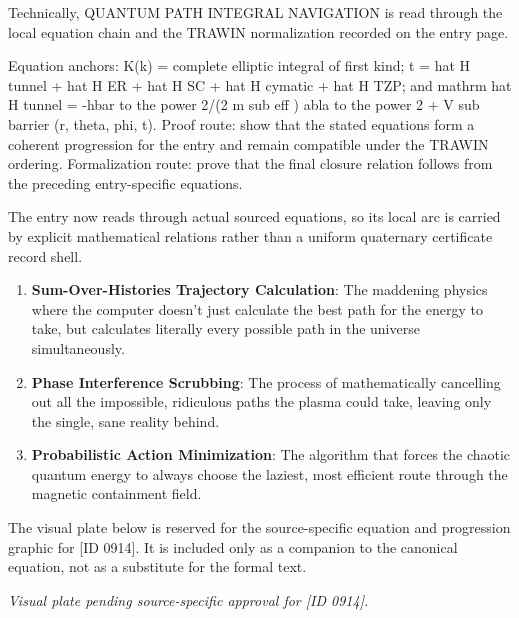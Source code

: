 Technically, QUANTUM PATH INTEGRAL NAVIGATION is read through the local equation chain and the TRAWIN normalization recorded on the entry page.

Equation anchors: K(k) = complete elliptic integral of first kind; t = hat H tunnel + hat H ER + hat H SC + hat H cymatic + hat H TZP; and mathrm hat H tunnel = -hbar to the power 2/(2 m sub eff ) abla to the power 2 + V sub barrier (r, theta, phi, t). Proof route: show that the stated equations form a coherent progression for the entry and remain compatible under the TRAWIN ordering. Formalization route: prove that the final closure relation follows from the preceding entry-specific equations.

The entry now reads through actual sourced equations, so its local arc is carried by explicit mathematical relations rather than a uniform quaternary certificate record shell.
\endgroup

\begin{enumerate}[leftmargin=1.6em,itemsep=6pt,topsep=4pt]
\item \textbf{Sum-Over-Histories Trajectory Calculation}: The maddening physics where the computer doesn't just calculate the best path for the energy to take, but calculates literally every possible path in the universe simultaneously.
\item \textbf{Phase Interference Scrubbing}: The process of mathematically cancelling out all the impossible, ridiculous paths the plasma could take, leaving only the single, sane reality behind.
\item \textbf{Probabilistic Action Minimization}: The algorithm that forces the chaotic quantum energy to always choose the laziest, most efficient route through the magnetic containment field.
\end{enumerate}

\begingroup\footnotesize\sloppy
The visual plate below is reserved for the source-specific equation and progression graphic for [ID 0914]. It is included only as a companion to the canonical equation, not as a substitute for the formal text.
\par\endgroup
\begingroup\footnotesize\itshape
Visual plate pending source-specific approval for [ID 0914].
\par\endgroup

